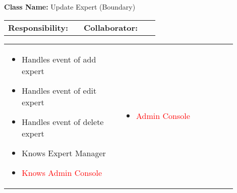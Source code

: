 \begin{cards}[]
    \textbf{Class Name:} Update Expert (Boundary)
    \tcbline
    \begin{tabular}{p{0.45\linewidth} | p{0.45\linewidth}}
        \textbf{Responsibility:}& 
        \textbf{Collaborator:}\\
    \end{tabular}
    \tcbline
    \begin{tabular}{p{0.45\linewidth} | p{0.45\linewidth}}
        \begin{itemize}
            \item Handles event of add expert
            \item Handles event of edit expert
            \item Handles event of delete expert
            \item Knows Expert Manager
            \item \textcolor{red}{Knows Admin Console}
        \end{itemize}
        &
        \begin{itemize}
            \item \textcolor{red}{Admin Console}
        \end{itemize}
    \end{tabular}
\end{cards}